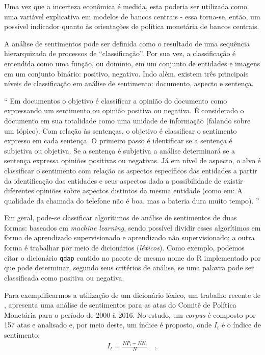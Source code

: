 Uma vez que a incerteza econômica é medida, esta poderia ser utilizada como uma variável explicativa em modelos de bancos centrais - essa torna-se, então, um possível indicador quanto às orientações de política monetária de bancos centrais.

A análise de sentimentos pode ser definida como o resultado de uma sequência hierarquizada de processos de ``classificação''. Por sua vez, a classificação é entendida como uma função, ou domínio, em um conjunto de entidades e imagens em um conjunto binário: positivo, negativo. Indo além, existem três principais níveis de classificação em análise de sentimento: documento, aspecto e sentença.

\begin{citacao}``
Em documentos o objetivo é classificar a opinião do documento como expressando um sentimento ou opinião positiva ou negativa. É considerado o documento em sua totalidade como uma unidade de informação (falando sobre um tópico). Com
relação às sentenças, o objetivo é classificar o sentimento expresso em cada sentença. O primeiro passo é identificar se a sentença é subjetiva ou objetiva. Se a sentença é subjetiva a análise determinará se a sentença expressa opiniões positivas ou negativas. Já em nível de aspecto, o alvo é classificar o sentimento com relação as aspectos específicos das entidades a partir da identificação das entidades e seus aspectos dada a possibilidade de existir diferentes opiniões sobre aspectos distintos da mesma entidade (como em: A qualidade da chamada do telefone não é boa, mas a bateria dura muito tempo). '' \cite[p.12]{costa2016ensaios}
\end{citacao}

Em geral, pode-se classificar algorítimos de análise de sentimentos de duas formas: baseados em \textit{machine learning}, sendo possível dividir esses algorítimos em forma de aprendizado supervisionado e aprendizado não supervisionado; a outra forma é trabalhar por meio de dicionários (\textit{léxicos}). Como exemplo, podemos citar o dicionário \texttt{qdap} contido no pacote de mesmo nome do R implementado por  que pode determinar, segundo seus critérios de análise, se uma palavra pode ser classificada como positiva ou negativa.

Para exemplificarmos a utilização de um dicionário léxico, um trabalho recente de , apresenta uma análise de sentimentos para as atas do Comitê de Política Monetária para o período de 2000 à 2016. No estudo, um \textit{corpus} é composto por 157 atas e analisado e, por meio deste, um índice é proposto, onde $I_t$ é o índice de sentimento:
\begin{align} \label{indicecosta}
    I_t = \frac{NP_t - NN_t}{N} \quad ,
\end{align}



